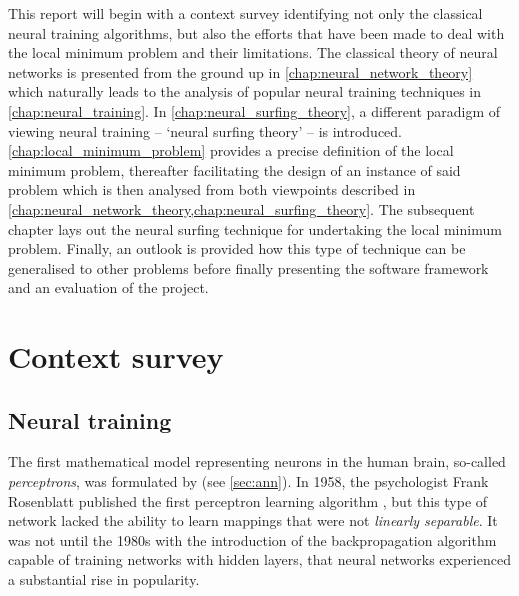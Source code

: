 This report will begin with a context survey identifying not only the classical neural training algorithms, but also the efforts that have been made to deal with the local minimum problem and their limitations.
The classical theory of neural networks is presented from the ground up in \ref{chap:neural_network_theory} which naturally leads to the analysis of popular neural training techniques in \ref{chap:neural_training}.
In \ref{chap:neural_surfing_theory}, a different paradigm of viewing neural training -- `neural surfing theory' -- is introduced.
\ref{chap:local_minimum_problem} provides a precise definition of the local minimum problem, thereafter facilitating the design of an instance of said problem which is then analysed from both viewpoints described in \ref{chap:neural_network_theory,chap:neural_surfing_theory}.
The subsequent chapter lays out the neural surfing technique for undertaking the local minimum problem.
Finally, an outlook is provided how this type of technique can be generalised to other problems before finally presenting the software framework and an evaluation of the project.

\section{Context survey}
\subsection{Neural training}
\label{sec:context_anns}
The first mathematical model representing neurons in the human brain, so-called \textit{perceptrons}, was formulated by \textcite{mcculloch1943} (see \ref{sec:ann}).
In 1958, the psychologist Frank Rosenblatt published the first perceptron learning algorithm \cite{rosenblatt1958}, but this type of network lacked the ability to learn mappings that were not \textit{linearly separable}.
It was not until the 1980s with the introduction of the backpropagation algorithm capable of training networks with hidden layers, that neural networks experienced a substantial rise in popularity.

